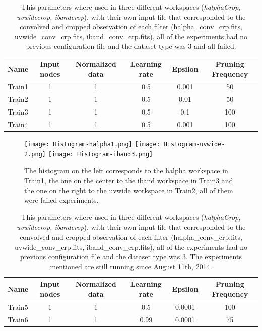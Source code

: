 \documentclass[11pt,fleqn]{book} %
\begin{document}
\begin{table}[h!]
  \centering
    \begin{tabular}{ c c c c c c }
    \hline\hline
    
    Name & Input nodes & Normalized data & Learning rate & Epsilon & Pruning Frequency\\
    \hline
    
    Train1 & 1 & 1 & 0.5 & 0.001 & 50\\
    Train2 & 1 & 1 & 0.5 & 0.01 & 50\\
    Train3 & 1 & 1 & 0.5 & 0.1 & 100\\
    Train4 & 1 & 1 & 0.5 & 0.001 & 100\\
    
    \hline
  \end{tabular}
  \caption{This parameters where used in three different workspaces (\emph{halphaCrop, uvwidecrop, ibandcrop}), with their own input file that corresponded to the convolved and cropped observation of each filter (halpha\_conv\_crp.fits, uvwide\_conv\_crp.fits, iband\_conv\_crp.fits), all of the experiments had no previous configuration file and the dataset type was 3 and all failed.}
  \label{tab:threefail}
\end{table}

\begin{figure}[h!]
	\centering
    \texttt{[image: Histogram-halpha1.png]}
    \texttt{[image: Histogram-uvwide-2.png]}
    \texttt{[image: Histogram-iband3.png]}
    \caption{The histogram on the left corresponds to the halpha workspace in Train1, the one on the center to the iband workspace in Train3 and the one on the right to the uvwide workspace in Train2, all of them were failed experiments.}
    \label{img:fail3}
\end{figure}

\begin{table}[h!]
  \centering
    \begin{tabular}{ c c c c c c }
    \hline\hline
    
    Name & Input nodes & Normalized data & Learning rate & Epsilon & Pruning Frequency\\
    \hline
    
    Train5 & 1 & 1 & 0.5 & 0.0001 & 100\\
    Train6 & 1 & 1 & 0.99 & 0.0001 & 75\\

    \hline
  \end{tabular}
  \caption{This parameters where used in three different workspaces (\emph{halphaCrop, uvwidecrop, ibandcrop}), with their own input file that corresponded to the convolved and cropped observation of each filter (halpha\_conv\_crp.fits, uvwide\_conv\_crp.fits, iband\_conv\_crp.fits), all of the experiments had no previous configuration file and the dataset type was 3. The experiments mentioned are still running since August 11th, 2014.}
  \label{tab:threerun}
\end{table}
\end{document}
